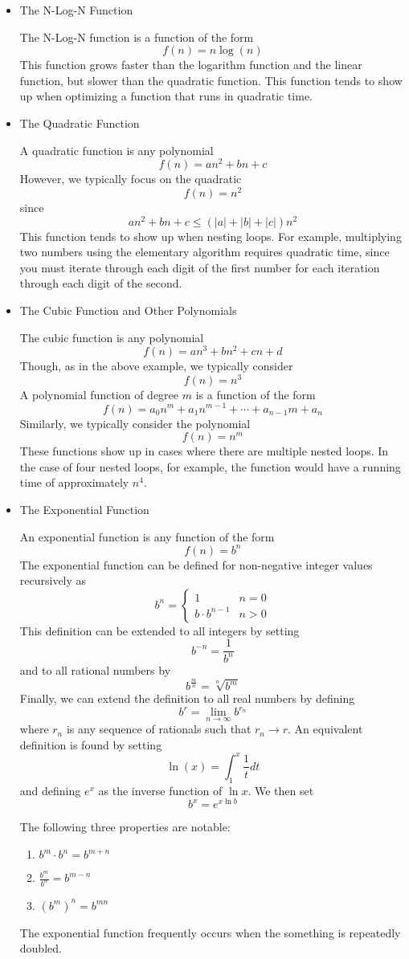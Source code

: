 \documentclass[a4paper]{article}
\begin{document}
\begin{itemize}
  \item The N-Log-N Function

  The N-Log-N function is a function of the form \[f(n)=n\log(n)\] This function grows faster than the logarithm function and the linear function, but slower than the quadratic function. This function tends to show up when optimizing a function that runs in quadratic time.
  \item The Quadratic Function

  A quadratic function is any polynomial \[f(n) = an^2+bn+c\] However, we typically focus on the quadratic \[f(n) = n^2\] since \[an^2+bn+c\leq\left(|a|+|b|+|c|\right)n^2\] This function tends to show up when nesting loops. For example, multiplying two numbers using the elementary algorithm requires quadratic time, since you must iterate through each digit of the first number for each iteration through each digit of the second.

  \item The Cubic Function and Other Polynomials

  The cubic function is any polynomial \[f(n)=an^3+bn^2+cn+d\] Though, as in the above example, we typically consider \[f(n) = n^3\] A polynomial function of degree $m$ is a function of the form \[f(n)=a_0n^m+a_1n^{m-1}+\cdots+a_{n-1}m+a_n\] Similarly, we typically consider the polynomial \[f(n)=n^m\] These functions show up in cases where there are multiple nested loops. In the case of four nested loops, for example, the function would have a running time of approximately $n^4$.

  \item The Exponential Function

  An exponential function is any function of the form \[f(n)=b^n\] The exponential function can be defined for non-negative integer values recursively as \[b^n=\begin{cases}1 & n = 0\\b\cdot b^{n-1} & n>0\end{cases}\] This definition can be extended to all integers by setting \[b^{-n}=\frac{1}{b^n}\] and to all rational numbers by \[b^{\frac{m}{n}}=\sqrt[n]{b^m}\] Finally, we can extend the definition to all real numbers by defining \[b^r=\lim_{n\to\infty}b^{r_n}\] where $r_n$ is any sequence of rationals such that $r_n\to r$. An equivalent definition is found by setting \[\ln(x)=\int_1^x\frac{1}{t}dt\] and defining $e^x$ as the inverse function of $\ln{x}$. We then set \[b^x=e^{x\ln{b}}\]

  The following three properties are notable:
  \begin{enumerate}
  \item $b^m\cdot b^n=b^{m+n}$
  \item $\frac{b^m}{b^n}=b^{m-n}$
  \item $(b^m)^n=b^{mn}$
  \end{enumerate}

The exponential function frequently occurs when the something is repeatedly doubled.
\end{itemize}
\end{document}
